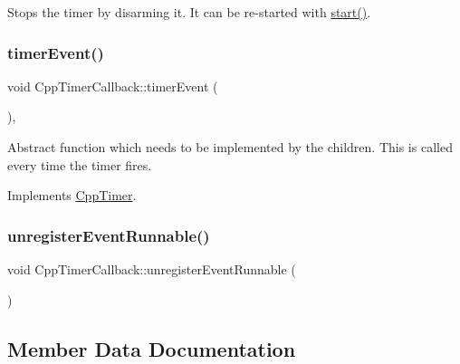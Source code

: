 Stops the timer by disarming it. It can be re-\/started with \hyperlink{classCppTimer_a64989025caa3c030c6c397ca76a2d20b}{start()}. \mbox{\label{classCppTimerCallback_af6b39f5eb8e98bfc1b301ac3f25276e9}} 
\subsubsection{\texorpdfstring{timer\+Event()}{timerEvent()}}
{\footnotesize\ttfamily void Cpp\+Timer\+Callback\+::timer\+Event (\begin{DoxyParamCaption}{ }\end{DoxyParamCaption})\hspace{0.3cm}{\ttfamily [inline]}, {\ttfamily [virtual]}}

Abstract function which needs to be implemented by the children. This is called every time the timer fires. 

Implements \hyperlink{classCppTimer_ac2665403595b6aee5f581d0ebfeb886c}{Cpp\+Timer}.

\mbox{\label{classCppTimerCallback_a29d8d5a426a3d15bca8a42c2c897f50f}} 
\subsubsection{\texorpdfstring{unregister\+Event\+Runnable()}{unregisterEventRunnable()}}
{\footnotesize\ttfamily void Cpp\+Timer\+Callback\+::unregister\+Event\+Runnable (\begin{DoxyParamCaption}{ }\end{DoxyParamCaption})\hspace{0.3cm}{\ttfamily [inline]}}



\subsection{Member Data Documentation}
\mbox{\label{classCppTimerCallback_a578cc701cee7be10f3afab2859eac74f}} 
